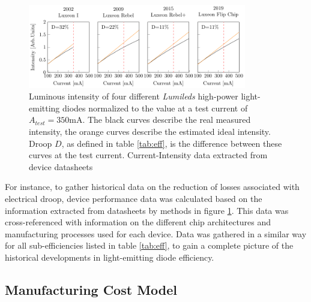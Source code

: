 \documentclass[a4paper,nocompress]{spie}  %
\begin{document}
        \begin{figure} [ht]
            \begin{center}
                \includegraphics[width=0.85\textwidth]{SPIE/article/droop_lumileds.pdf}
            \end{center}
            \caption{Luminous intensity of four different \textit{Lumileds} high-power light-emitting diodes normalized to the value at a test current of $A_{test}=350$mA. The black curves describe the real measured intensity, the orange curves describe the estimated ideal intensity. Droop $D$, as defined in table \ref{tab:eff}, is the difference between these curves at the test current. Current-Intensity data extracted from device datasheets \cite{datasheet_lumileds_lux1,datasheet_lumileds_rebel,datasheet_lumileds_rebplus,lumi2019data}}
            \label{fig:droop}
        \end{figure}
        
        For instance, to gather historical data on the reduction of losses associated with electrical droop, device performance data was calculated based on the information extracted from datasheets by methods in figure \ref{fig:droop}. This data was cross-referenced with information on the different chip architectures and manufacturing processes used for each device. Data was gathered in a similar way for all sub-efficiencies listed in table \ref{tab:eff}, to gain a complete picture of the historical developments in light-emitting diode efficiency.

    \subsection{Manufacturing Cost Model}
\end{document}
